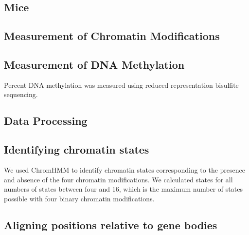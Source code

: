 \documentclass[10pt,letterpaper]{article}
\begin{document}
\hypertarget{mice}{%
\subsection{Mice}\label{mice}}

\hypertarget{measurement-of-chromatin-modifications}{%
\subsection{Measurement of Chromatin
Modifications}\label{measurement-of-chromatin-modifications}}

\hypertarget{measurement-of-dna-methylation}{%
\subsection{Measurement of DNA
Methylation}\label{measurement-of-dna-methylation}}

Percent DNA methylation was measured using reduced representation
bisulfite sequencing.

\hypertarget{data-processing}{%
\subsection{Data Processing}\label{data-processing}}

\hypertarget{section}{%
\subsection{}\label{section}}

\hypertarget{identifying-chromatin-states}{%
\subsection{Identifying chromatin
states}\label{identifying-chromatin-states}}

We used ChromHMM to identify chromatin states corresponding to the
presence and absence of the four chromatin modifications. We calculated
states for all numbers of states between four and 16, which is the
maximum number of states possible with four binary chromatin
modifications.

\hypertarget{aligning-positions-relative-to-gene-bodies}{%
\subsection{Aligning positions relative to gene
bodies}\label{aligning-positions-relative-to-gene-bodies}}
\end{document}
